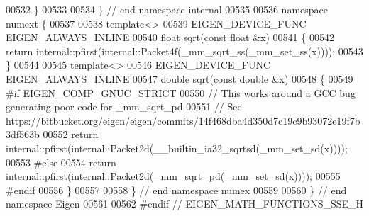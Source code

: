\begin{DoxyCode}
00532 \}
00533 
00534 \} \textcolor{comment}{// end namespace internal}
00535 
00536 \textcolor{keyword}{namespace }numext \{
00537 
00538 \textcolor{keyword}{template}<>
00539 EIGEN\_DEVICE\_FUNC EIGEN\_ALWAYS\_INLINE
00540 \textcolor{keywordtype}{float} sqrt(\textcolor{keyword}{const} \textcolor{keywordtype}{float} &x)
00541 \{
00542   \textcolor{keywordflow}{return} internal::pfirst(internal::Packet4f(\_mm\_sqrt\_ss(\_mm\_set\_ss(x))));
00543 \}
00544 
00545 \textcolor{keyword}{template}<>
00546 EIGEN\_DEVICE\_FUNC EIGEN\_ALWAYS\_INLINE
00547 \textcolor{keywordtype}{double} sqrt(\textcolor{keyword}{const} \textcolor{keywordtype}{double} &x)
00548 \{
00549 \textcolor{preprocessor}{#if EIGEN\_COMP\_GNUC\_STRICT}
00550   \textcolor{comment}{// This works around a GCC bug generating poor code for \_mm\_sqrt\_pd}
00551   \textcolor{comment}{// See https://bitbucket.org/eigen/eigen/commits/14f468dba4d350d7c19c9b93072e19f7b3df563b}
00552   \textcolor{keywordflow}{return} internal::pfirst(internal::Packet2d(\_\_builtin\_ia32\_sqrtsd(\_mm\_set\_sd(x))));
00553 \textcolor{preprocessor}{#else}
00554   \textcolor{keywordflow}{return} internal::pfirst(internal::Packet2d(\_mm\_sqrt\_pd(\_mm\_set\_sd(x))));
00555 \textcolor{preprocessor}{#endif}
00556 \}
00557 
00558 \} \textcolor{comment}{// end namespace numex}
00559 
00560 \} \textcolor{comment}{// end namespace Eigen}
00561 
00562 \textcolor{preprocessor}{#endif // EIGEN\_MATH\_FUNCTIONS\_SSE\_H}
\end{DoxyCode}
